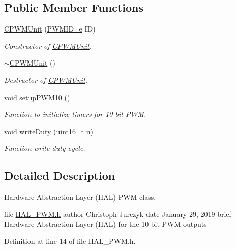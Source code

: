 \subsection*{Public Member Functions}
\begin{DoxyCompactItemize}
\item 
\mbox{\hyperlink{class_c_p_w_m_unit_a9e68713e9f26f6d36714a58648494afb}{C\+P\+W\+M\+Unit}} (\mbox{\hyperlink{class_c_p_w_m_unit_ad3e55d1df0367d8a090d4b835704be44}{P\+W\+M\+I\+D\+\_\+e}} ID)
\begin{DoxyCompactList}\small\item\em Constructor of \mbox{\hyperlink{class_c_p_w_m_unit}{C\+P\+W\+M\+Unit}}. \end{DoxyCompactList}\item 
\mbox{\hyperlink{class_c_p_w_m_unit_aabfa153a1f1019befa096147428a3822}{$\sim$\+C\+P\+W\+M\+Unit}} ()
\begin{DoxyCompactList}\small\item\em Destructor of \mbox{\hyperlink{class_c_p_w_m_unit}{C\+P\+W\+M\+Unit}}. \end{DoxyCompactList}\item 
void \mbox{\hyperlink{class_c_p_w_m_unit_aa36627883e91d3dec4a76fe187588071}{setup\+P\+W\+M10}} ()
\begin{DoxyCompactList}\small\item\em Function to initialize timers for 10-\/bit P\+WM. \end{DoxyCompactList}\item 
void \mbox{\hyperlink{class_c_p_w_m_unit_a60f8be5eabf779f57e6392a0432bf7f2}{write\+Duty}} (\mbox{\hyperlink{_a_d_a_s___types_8h_a1f1825b69244eb3ad2c7165ddc99c956}{uint16\+\_\+t}} n)
\begin{DoxyCompactList}\small\item\em Function write duty cycle. \end{DoxyCompactList}\end{DoxyCompactItemize}


\subsection{Detailed Description}
Hardware Abstraction Layer (H\+AL) P\+WM class. 

file \mbox{\hyperlink{_h_a_l___p_w_m_8h}{H\+A\+L\+\_\+\+P\+W\+M.\+h}} author Christoph Jurczyk date January 29, 2019 brief Hardware Abstraction Layer (H\+AL) for the 10-\/bit P\+WM outputs 

Definition at line 14 of file H\+A\+L\+\_\+\+P\+W\+M.\+h.



